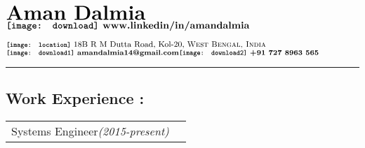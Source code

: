 \documentclass[8pt]{article}
\begin{document}
\small
\begin{raggedleft}
$^{\text{\bfseries {\huge Aman Dalmia}}}_{\text{\normalsize\bfseries\texttt{[image: download]}  {www.linkedin/in/amandalmia}}}$
\end{raggedleft}
\hfill
\begin{raggedright}
$^{\text{{\bfseries \texttt{[image: location]}}   \footnotesize{18B R M Dutta Road, Kol-20, \textsc {West Bengal, India}}}}_{{\text{{\bfseries \texttt{[image: download1]}}  {\bfseries \scriptsize amandalmia14@gmail.com}}}{\text{{\bfseries \texttt{[image: download2]}}    {\bfseries \scriptsize+91 727 8963 565}}}}$
 

\end{raggedright}
\vspace{5pt}
\hrule


\subsection*{Work Experience :}
\vspace{-0.5cm}
\begin{supertabular}{p{0.8\textwidth}!{\color{lightgrey}\vrule}p{0.2\textwidth}}
Systems Engineer\textit{(2015-present)}

&
{}\\

\end{supertabular}

\vspace{-4mm}

\end{document}
